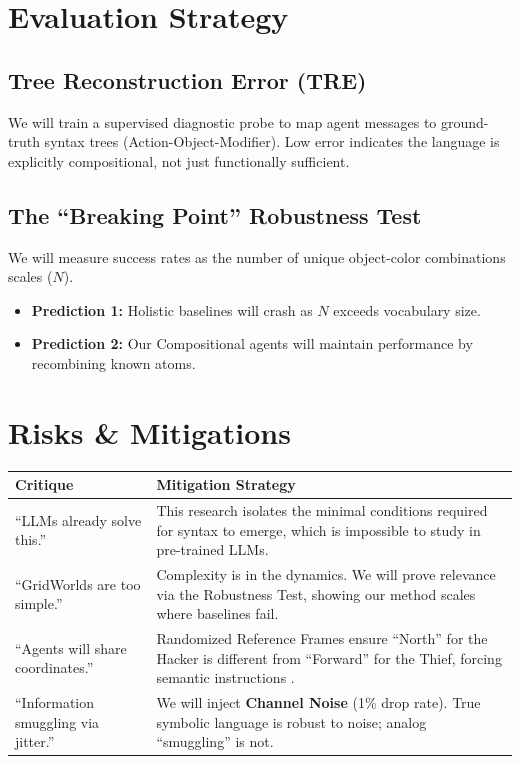 \documentclass[11pt]{article}
\begin{document}
\section{Evaluation Strategy}

\subsection{Tree Reconstruction Error (TRE)}
We will train a supervised diagnostic probe to map agent messages to ground-truth syntax trees (Action-Object-Modifier). Low error indicates the language is explicitly compositional, not just functionally sufficient.

\subsection{The ``Breaking Point'' Robustness Test}
We will measure success rates as the number of unique object-color combinations scales ($N$).
\begin{itemize}
    \item \textbf{Prediction 1:} Holistic baselines will crash as $N$ exceeds vocabulary size.
    \item \textbf{Prediction 2:} Our Compositional agents will maintain performance by recombining known atoms.
\end{itemize}

\section{Risks \& Mitigations}

\begin{table}[h]
\centering
\begin{tabular}{@{}lp{}@{}}
\toprule
\textbf{Critique} & \textbf{Mitigation Strategy} \\ \midrule
``LLMs already solve this.'' & This research isolates the minimal conditions required for syntax to emerge, which is impossible to study in pre-trained LLMs. \\ \addlinespace
``GridWorlds are too simple.'' & Complexity is in the dynamics. We will prove relevance via the Robustness Test, showing our method scales where baselines fail. \\ \addlinespace
``Agents will share coordinates.'' & Randomized Reference Frames ensure ``North'' for the Hacker is different from ``Forward'' for the Thief, forcing semantic instructions \cite{5}. \\ \addlinespace
``Information smuggling via jitter.'' & We will inject \textbf{Channel Noise} (1\% drop rate). True symbolic language is robust to noise; analog ``smuggling'' is not. \\ \bottomrule
\end{tabular}
\end{table}
\end{document}
